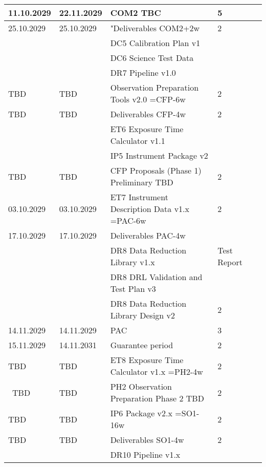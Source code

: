 \begin{table}
\begin{tabularx}{\textwidth}{lllll}
\hline
11.10.2029 &	22.11.2029 &	COM2 TBC						    &	5 \\
\hline
25.10.2029 &	25.10.2029 &	"Deliverables COM2+2w                                       &	2 \\
           &               &	DC5 Calibration Plan v1					    &	\\
           &               &	DC6 Science Test Data                                       &	\\
 	   &		   &	DR7 Pipeline v1.0					    &	\\
\hline
TBD        &	TBD	   &	Observation Preparation Tools v2.0  =CFP-6w     	    &	2 \\
\hline
TBD	   &	TBD	   &	Deliverables CFP-4w                                         &	2 \\
           &               &    ET6 Exposure Time Calculator v1.1			    &	\\
	   &		   &	IP5 Instrument Package v2				    &	\\
\hline
TBD	   &	TBD	   &	CFP Proposals (Phase 1) Preliminary  TBD		    &	2 \\
\hline
03.10.2029 &	03.10.2029 &	ET7 Instrument Description Data v1.x =PAC-6w		    &	2 \\
\hline
17.10.2029 &	17.10.2029 &	Deliverables PAC-4w                                         &	\\
   	   &               &    DR8 Data Reduction Library v1.x & Test Report               &	\\
           &               &    DR8 DRL Validation and Test Plan v3                         &	\\
           &               &    DR8 Data Reduction Library Design v2			    &	2 \\
\hline
14.11.2029 &	14.11.2029 &	PAC							    &	3 \\
\hline
15.11.2029 &	14.11.2031 &	Guarantee period 					    &	2 \\
\hline
TBD        &	TBD        &	ET8 Exposure Time Calculator v1.x =PH2-4w		    &	2 \\
\
TBD        &	TBD        &	PH2 Observation Preparation Phase 2 TBD			    &	2 \\
\hline
TBD        &	TBD        &	IP6 Package v2.x =SO1-16w				    &	2 \\
\hline
TBD        &	TBD        &	Deliverables SO1-4w                                         &	2 \\
           &               &    DR10 Pipeline v1.x					    &	\\

\end{tabularx}
\end{table}
